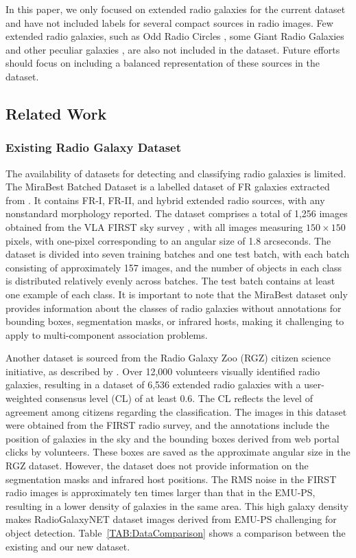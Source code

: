 \documentclass[
  journal=pasa,
  manuscript=research-paper, %
  year=2020,
  volume=37,
]{cup-journal}
\begin{document}
In this paper, we only focused on extended radio galaxies for the current dataset and have not included labels for several compact sources in radio images.
Few extended radio galaxies, such as Odd Radio Circles \citep[][]{norris21c}, some Giant Radio Galaxies and other peculiar galaxies \citep[][]{gupta22}, are also not included in the dataset. 
Future efforts should focus on including a balanced representation of these sources in the dataset.

\subsection{Related Work}
\label{SEC:Related}
\subsubsection{Existing Radio Galaxy Dataset}
The availability of datasets for detecting and classifying radio galaxies is limited. 
The MiraBest Batched Dataset is a labelled dataset of FR galaxies extracted from \cite{miraghaei17}. 
It contains FR-I, FR-II, and hybrid extended radio sources, with any nonstandard morphology reported. 
The dataset comprises a total of 1,256 images obtained from the VLA FIRST sky survey \citep{becker95}, with all images measuring $150 \times 150$ pixels, with one-pixel corresponding to an angular size of 1.8 arcseconds. 
The dataset is divided into seven training batches and one test batch, with each batch consisting of approximately 157 images, and the number of objects in each class is distributed relatively evenly across batches. 
The test batch contains at least one example of each class. 
It is important to note that the MiraBest dataset only provides information about the classes of radio galaxies without annotations for bounding boxes, segmentation masks, or infrared hosts, making it challenging to apply to multi-component association problems.

Another dataset is sourced from the Radio Galaxy Zoo (RGZ) citizen science initiative, as described by \citep[][]{wu19}. 
Over 12,000 volunteers visually identified radio galaxies, resulting in a dataset of 6,536 extended radio galaxies with a user-weighted consensus level (CL) of at least 0.6. 
The CL reflects the level of agreement among citizens regarding the classification. 
The images in this dataset were obtained from the FIRST radio survey, and the annotations include the position of galaxies in the sky and the bounding boxes derived from web portal clicks by volunteers. 
These boxes are saved as the approximate angular size in the RGZ dataset. However, the dataset does not provide information on the segmentation masks and infrared host positions. 
The RMS noise in the FIRST radio images is approximately ten times larger than that in the EMU-PS, resulting in a lower density of galaxies in the same area.
This high galaxy density makes RadioGalaxyNET dataset images derived from EMU-PS challenging for object detection.
Table~\ref{TAB:DataComparison} shows a comparison between the existing and our new dataset.
\end{document}
